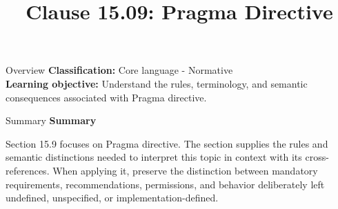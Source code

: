 \documentclass[10pt,letterpaper]{article}
\title{Clause 15.09: Pragma Directive}
\author{}
\date{}
\begin{document}
\maketitle
\begin{CornellOverviewBox}{Overview}
\textbf{Classification:} Core language - Normative\\[2pt]
\textbf{Learning objective:} Understand the rules, terminology, and semantic consequences associated with Pragma directive.
\end{CornellOverviewBox}\begin{CornellSummaryBox}{Summary}
{\sffamily\bfseries\color{Accent} Summary}\par\vspace{3pt}Section 15.9 focuses on Pragma directive. The section supplies the rules and semantic distinctions needed to interpret this topic in context with its cross-references. When applying it, preserve the distinction between mandatory requirements, recommendations, permissions, and behavior deliberately left undefined, unspecified, or implementation-defined.
\end{CornellSummaryBox}
\end{document}
